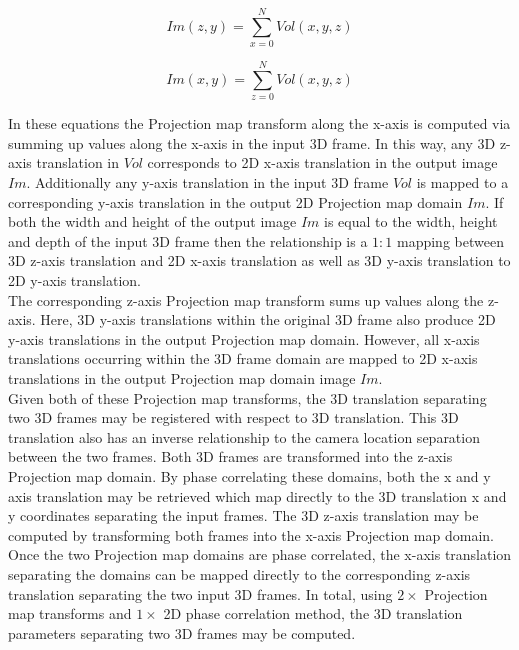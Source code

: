 \begin{equation} \label{eqn:xPMT}
Im(z,y) = \sum_{x=0}^{N}{Vol(x,y,z)}
\end{equation}

\begin{equation} \label{eqn:zPMT}
Im(x,y) = \sum_{z=0}^{N}{Vol(x,y,z)}
\end{equation}

In these equations the Projection map transform along the x-axis is computed via summing up values along the x-axis in the input 3D frame. In this way, any 3D z-axis translation in $Vol$ corresponds to 2D x-axis translation in the output image $Im$. Additionally any y-axis translation in the input 3D frame $Vol$ is mapped to a corresponding y-axis translation in the output 2D Projection map domain $Im$. If both the width and height of the output image $Im$ is equal to the width, height and depth of the input 3D frame then the relationship is a $1:1$ mapping between 3D z-axis translation and 2D x-axis translation as well as 3D y-axis translation to 2D y-axis translation. \\

The corresponding z-axis Projection map transform sums up values along the z-axis. Here, 3D y-axis translations within the original 3D frame also produce 2D y-axis translations in the output Projection map domain. However, all x-axis translations occurring within the 3D frame domain are mapped to 2D x-axis translations in the output Projection map domain image $Im$. \\

Given both of these Projection map transforms, the 3D translation separating two 3D frames may be registered with respect to 3D translation. This 3D translation also has an inverse relationship to the camera location separation between the two frames. Both 3D frames are transformed into the z-axis Projection map domain. By phase correlating these domains, both the x and y axis translation may be retrieved which map directly to the 3D translation x and y coordinates separating the input frames. The 3D z-axis translation may be computed by transforming both frames into the x-axis Projection map domain. Once the two Projection map domains are phase correlated, the x-axis translation separating the domains can be mapped directly to the corresponding z-axis translation separating the two input 3D frames. In total, using $2 \times$ Projection map transforms and $1 \times$ 2D phase correlation method, the 3D translation parameters separating two 3D frames may be computed. \\

